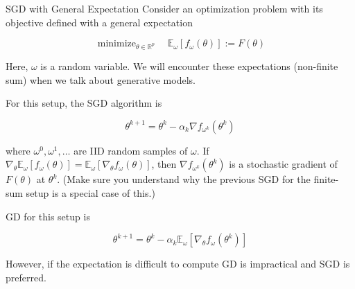 \begin{frame}[allowframebreaks]

\begin{myconceptblock}{2.22}{SGD with General Expectation}
    Consider an optimization problem with its objective defined with a general expectation

    $$
    \operatorname{minimize}_{\theta \in \mathbb{R}^{p}} \quad \mathbb{E}_{\omega}\left[f_{\omega}(\theta)\right]:=F(\theta)
    $$

    Here, $\omega$ is a random variable. We will encounter these expectations (non-finite sum) when we talk about generative models.

    For this setup, the SGD algorithm is

    $$
    \theta^{k+1}=\theta^{k}-\alpha_{k} \nabla f_{\omega^{k}}\left(\theta^{k}\right)
    $$

    where $\omega^{0}, \omega^{1}, \ldots$ are IID random samples of $\omega$. If $\nabla_{\theta} \mathbb{E}_{\omega}\left[f_{\omega}(\theta)\right]=\mathbb{E}_{\omega}\left[\nabla_{\theta} f_{\omega}(\theta)\right]$, then $\nabla f_{\omega^{k}}\left(\theta^{k}\right)$ is a stochastic gradient of $F(\theta)$ at $\theta^{k}$. (Make sure you understand why the previous SGD for the finite-sum setup is a special case of this.)

    GD for this setup is

    $$
    \theta^{k+1}=\theta^{k}-\alpha_{k} \mathbb{E}_{\omega}\left[\nabla_{\theta} f_{\omega}\left(\theta^{k}\right)\right]
    $$

    However, if the expectation is difficult to compute GD is impractical and SGD is preferred.
\end{myconceptblock}

\end{frame}
